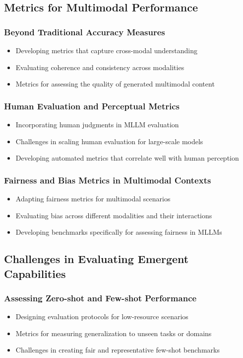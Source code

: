 \subsection{Metrics for Multimodal Performance}
\subsubsection{Beyond Traditional Accuracy Measures}
\begin{itemize}
    \item Developing metrics that capture cross-modal understanding
    \item Evaluating coherence and consistency across modalities
    \item Metrics for assessing the quality of generated multimodal content
\end{itemize}

\subsubsection{Human Evaluation and Perceptual Metrics}
\begin{itemize}
    \item Incorporating human judgments in MLLM evaluation
    \item Challenges in scaling human evaluation for large-scale models
    \item Developing automated metrics that correlate well with human perception
\end{itemize}

\subsubsection{Fairness and Bias Metrics in Multimodal Contexts}
\begin{itemize}
    \item Adapting fairness metrics for multimodal scenarios
    \item Evaluating bias across different modalities and their interactions
    \item Developing benchmarks specifically for assessing fairness in MLLMs
\end{itemize}

\subsection{Challenges in Evaluating Emergent Capabilities}
\subsubsection{Assessing Zero-shot and Few-shot Performance}
\begin{itemize}
    \item Designing evaluation protocols for low-resource scenarios
    \item Metrics for measuring generalization to unseen tasks or domains
    \item Challenges in creating fair and representative few-shot benchmarks
\end{itemize}

